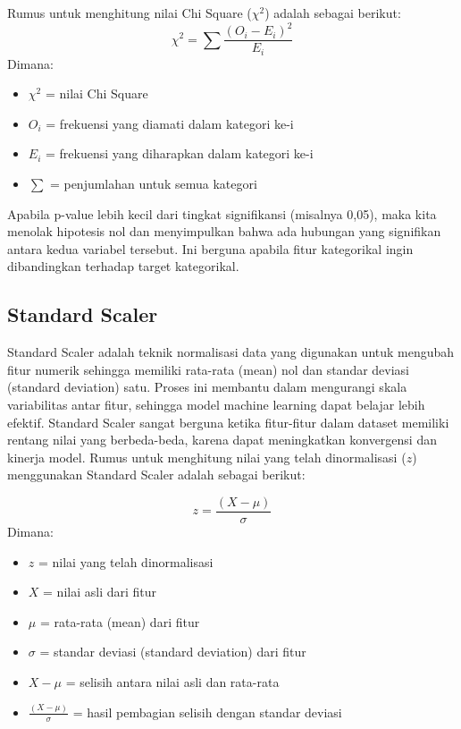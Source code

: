 Rumus untuk menghitung nilai Chi Square ($\chi^2$) adalah sebagai berikut:
\begin{equation}
    \chi^2 = \sum \frac{(O_i - E_i)^2}{E_i}
\end{equation}
Dimana:
\begin{itemize}
    \item $\chi^2$ = nilai Chi Square
    \item $O_i$ = frekuensi yang diamati dalam kategori ke-i
    \item $E_i$ = frekuensi yang diharapkan dalam kategori ke-i
    \item $\sum$ = penjumlahan untuk semua kategori
\end{itemize}

Apabila p-value lebih kecil dari tingkat signifikansi (misalnya 0,05), maka kita menolak hipotesis nol dan menyimpulkan bahwa ada hubungan yang signifikan antara kedua variabel tersebut. Ini berguna apabila fitur kategorikal ingin dibandingkan terhadap target kategorikal.

\subsection{Standard Scaler}
Standard Scaler adalah teknik normalisasi data yang digunakan untuk mengubah fitur numerik sehingga memiliki rata-rata (mean) nol dan standar deviasi (standard deviation) satu. Proses ini membantu dalam mengurangi skala variabilitas antar fitur, sehingga model machine learning dapat belajar lebih efektif. Standard Scaler sangat berguna ketika fitur-fitur dalam dataset memiliki rentang nilai yang berbeda-beda, karena dapat meningkatkan konvergensi dan kinerja model. 
Rumus untuk menghitung nilai yang telah dinormalisasi ($z$) menggunakan Standard Scaler adalah sebagai berikut:

\begin{equation}
    z = \frac{(X - \mu)}{\sigma}
\end{equation}
Dimana:
\begin{itemize}
    \item $z$ = nilai yang telah dinormalisasi
    \item $X$ = nilai asli dari fitur
    \item $\mu$ = rata-rata (mean) dari fitur
    \item $\sigma$ = standar deviasi (standard deviation) dari fitur
    \item $X - \mu$ = selisih antara nilai asli dan rata-rata
    \item $\frac{(X - \mu)}{\sigma}$ = hasil pembagian selisih dengan standar deviasi
\end{itemize}




